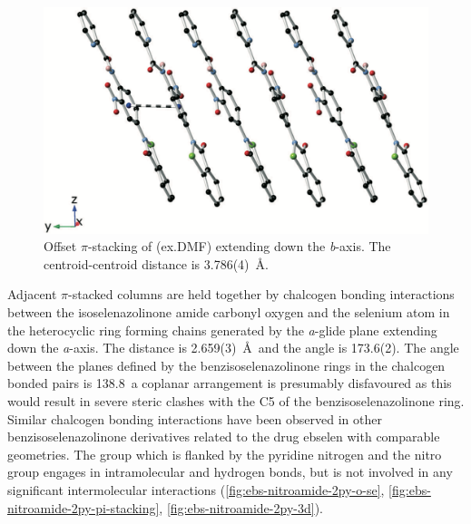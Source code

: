 \begin{refsection}
\begin{figure}
    \centering
    \includegraphics[width=0.8\linewidth]{Figures/ebs-nitroamide-2py-packing.pdf}
    \caption[Offset $\pi$-stacking of (ex.DMF) extending down the \emph{b}-axis.]{Offset $\pi$-stacking of (ex.DMF) extending down the \emph{b}-axis. The centroid-centroid distance is 3.786(4)~\AA.}\label{fig:ebs-nitroamide-2py-packing}
\end{figure}

Adjacent $\pi$-stacked columns are held together by chalcogen bonding interactions between the isoselenazolinone amide carbonyl oxygen and the selenium atom in the heterocyclic ring forming chains generated by the \emph{a}-glide plane extending down the \emph{a}-axis.
The  distance is 2.659(3)~\AA~and the  angle is 173.6(2)\degree.
The angle between the planes defined by the benzisoselenazolinone rings in the chalcogen bonded pairs is 138.8\degree~a coplanar arrangement is presumably disfavoured as this would result in severe steric clashes with the C5 of the benzisoselenazolinone ring.
Similar  chalcogen bonding interactions have been observed in other benzisoselenazolinone derivatives related to the drug ebselen with comparable geometries.\autocite{Fellowes2019,Thomas2015,Bhabak2007,Piatek1995}
The  group which is flanked by the pyridine nitrogen and the nitro group engages in intramolecular  and  hydrogen bonds, but is not involved in any significant intermolecular interactions (\cref{fig:ebs-nitroamide-2py-o-se}, \cref{fig:ebs-nitroamide-2py-pi-stacking}, \cref{fig:ebs-nitroamide-2py-3d}).


\end{refsection}
